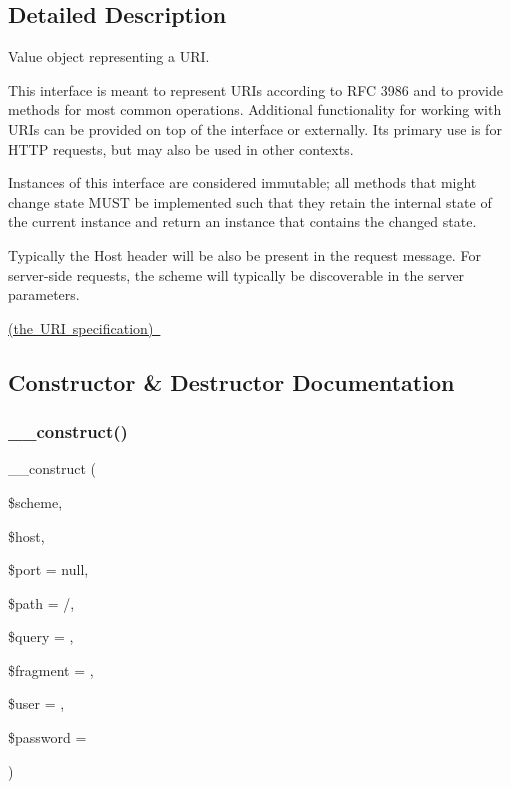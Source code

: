 \subsection{Detailed Description}
Value object representing a U\+RI.

This interface is meant to represent U\+R\+Is according to R\+FC 3986 and to provide methods for most common operations. Additional functionality for working with U\+R\+Is can be provided on top of the interface or externally. Its primary use is for H\+T\+TP requests, but may also be used in other contexts.

Instances of this interface are considered immutable; all methods that might change state M\+U\+ST be implemented such that they retain the internal state of the current instance and return an instance that contains the changed state.

Typically the Host header will be also be present in the request message. For server-\/side requests, the scheme will typically be discoverable in the server parameters.

\mbox{\hyperlink{}{(the U\+RI specification) }}

\subsection{Constructor \& Destructor Documentation}
\mbox{\label{class_pes_1_1_http_1_1_uri_ae4ff413f0f01becfb0249f58ebd309f0}} 
\subsubsection{\texorpdfstring{\+\_\+\+\_\+construct()}{\_\_construct()}}
{\footnotesize\ttfamily \+\_\+\+\_\+construct (\begin{DoxyParamCaption}\item[{}]{\$scheme,  }\item[{}]{\$host,  }\item[{}]{\$port = {\ttfamily null},  }\item[{}]{\$path = {\ttfamily \textquotesingle{}/\textquotesingle{}},  }\item[{}]{\$query = {\ttfamily \textquotesingle{}\textquotesingle{}},  }\item[{}]{\$fragment = {\ttfamily \textquotesingle{}\textquotesingle{}},  }\item[{}]{\$user = {\ttfamily \textquotesingle{}\textquotesingle{}},  }\item[{}]{\$password = {\ttfamily \textquotesingle{}\textquotesingle{}} }\end{DoxyParamCaption})}

